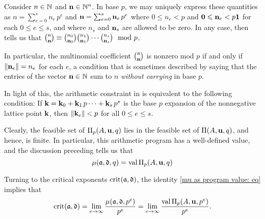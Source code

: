 \documentclass{amsart}
\begin{document}
\begin{remark}
 \label{dickson: R}
   Consider $n \in \mathbb{N}$ and $\mathbf{n} \in \mathbb{N}^n$.
   In base $p$, we may uniquely express these quantities as $n= \sum_{e=0}^s n_e \, p^e$ and $\mathbf{n}=\sum_{e=0}^s \mathbf{n}_e \, p^e$
where $0\le n_e < p$ and $\mathbf{0}\leqslant\mathbf{n}_e < p  \mathbf{1}$ for each $0 \leq e \leq s$, and where $n_s$ and $\mathbf{n}_s$ are allowed to be zero.
In any case, \cite{dickson.multinomial} then tells us that
$\binom{n}{\mathbf{n}}\equiv \binom{n_0}{\mathbf{n}_0}\binom{n_1}{\mathbf{n}_1}\cdots \binom{n_s}{\mathbf{n}_s} \mod{p}$.

In particular, the multinomial coefficient $\binom{n}{\mathbf{n}}$ is nonzero mod $p$ if and only if $\| \mathbf{n}_e \|=n_e$ for each $e$, a condition that is sometimes described by saying that the entries of the vector $\mathbf{n} \in \mathbb{N}$ sum to $n$ \emph{without carrying} in base $p$.

In light of this, the arithmetic constraint in  is equivalent to the following condition:  If
 $\mathbf{k} = \mathbf{k}_0 + \mathbf{k}_1 \, p\cdots + \mathbf{k}_s \, p^s$ is the base $p$ expansion of the nonnegative lattice point $\mathbf{k}$, then $\| \mathbf{k}_e \| < p$ for all $0 \leq e \leq s$.
\end{remark}

Clearly, the feasible set of $\Pi_p(A, \mathbf{u}, q)$ lies in the feasible set of $\Pi(A, \mathbf{u},q)$, and hence, is finite.
In particular, this arithmetic program has a well-defined value, and the discussion preceding  tells us that
%
\begin{equation}
\label{mu as program value: eq}
\mu(\mathfrak{a},\mathfrak{d},q) = \operatorname{val} \Pi_p(A,\mathbf{u},q)
\end{equation}
%

Turning to the critical exponents $\operatorname{crit}(\mathfrak{a}, \mathfrak{d})$, the identity \eqref{mu as program value: eq} implies that
%
\begin{equation}
\label{crit as limit of normalized program values: eq}
\operatorname{crit}(\mathfrak{a},\mathfrak{d}) = \lim_{e\to\infty} \frac{\mu(\mathfrak{a},\mathfrak{d},p^e)}{p^e} = \lim_{e\to\infty} \frac{\operatorname{val} \Pi_p(A,\mathbf{u},p^e)}{p^e}.
\end{equation}
%
\end{document}

